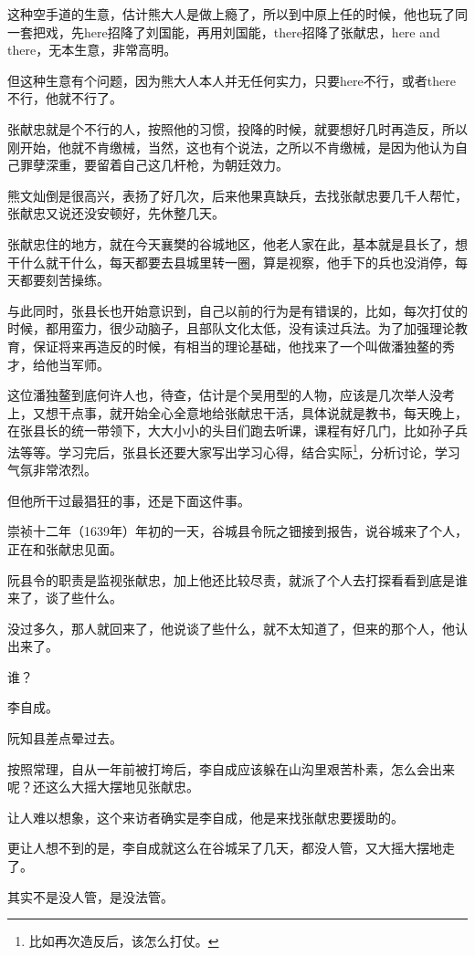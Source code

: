 \begin{multicols}{\theparacolNo}
这种空手道的生意，估计熊大人是做上瘾了，所以到中原上任的时候，他也玩了同一套把戏，先here招降了刘国能，再用刘国能，there招降了张献忠，here and there，无本生意，非常高明。

但这种生意有个问题，因为熊大人本人并无任何实力，只要here不行，或者there不行，他就不行了。

张献忠就是个不行的人，按照他的习惯，投降的时候，就要想好几时再造反，所以刚开始，他就不肯缴械，当然，这也有个说法，之所以不肯缴械，是因为他认为自己罪孽深重，要留着自己这几杆枪，为朝廷效力。

熊文灿倒是很高兴，表扬了好几次，后来他果真缺兵，去找张献忠要几千人帮忙，张献忠又说还没安顿好，先休整几天。

张献忠住的地方，就在今天襄樊的谷城地区，他老人家在此，基本就是县长了，想干什么就干什么，每天都要去县城里转一圈，算是视察，他手下的兵也没消停，每天都要刻苦操练。

与此同时，张县长也开始意识到，自己以前的行为是有错误的，比如，每次打仗的时候，都用蛮力，很少动脑子，且部队文化太低，没有读过兵法。为了加强理论教育，保证将来再造反的时候，有相当的理论基础，他找来了一个叫做潘独鳌的秀才，给他当军师。

这位潘独鳌到底何许人也，待查，估计是个吴用型的人物，应该是几次举人没考上，又想干点事，就开始全心全意地给张献忠干活，具体说就是教书，每天晚上，在张县长的统一带领下，大大小小的头目们跑去听课，课程有好几门，比如孙子兵法等等。学习完后，张县长还要大家写出学习心得，结合实际\footnote{比如再次造反后，该怎么打仗。}，分析讨论，学习气氛非常浓烈。

但他所干过最猖狂的事，还是下面这件事。

崇祯十二年（1639年）年初的一天，谷城县令阮之钿接到报告，说谷城来了个人，正在和张献忠见面。

阮县令的职责是监视张献忠，加上他还比较尽责，就派了个人去打探看看到底是谁来了，谈了些什么。

没过多久，那人就回来了，他说谈了些什么，就不太知道了，但来的那个人，他认出来了。

谁？

李自成。

阮知县差点晕过去。

按照常理，自从一年前被打垮后，李自成应该躲在山沟里艰苦朴素，怎么会出来呢？还这么大摇大摆地见张献忠。

让人难以想象，这个来访者确实是李自成，他是来找张献忠要援助的。

更让人想不到的是，李自成就这么在谷城呆了几天，都没人管，又大摇大摆地走了。

其实不是没人管，是没法管。


\end{multicols}
